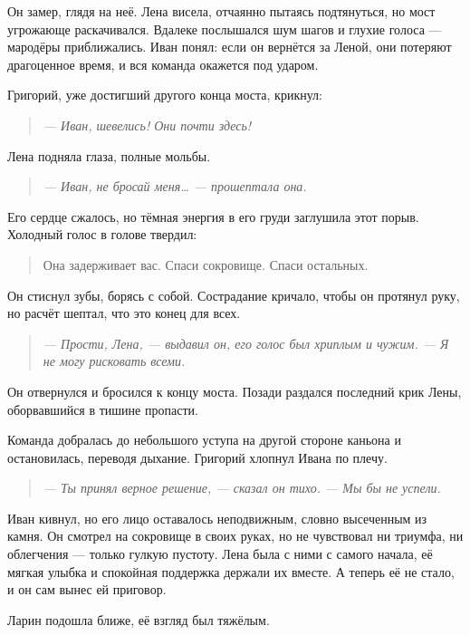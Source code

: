 \documentclass[12pt,a4paper]{book} %
\newenvironment{dialogue}{\begin{quote}\itshape}{\end{quote}}
\begin{document}
Он замер, глядя на неё. Лена висела, отчаянно пытаясь подтянуться, но мост угрожающе раскачивался. Вдалеке послышался шум шагов и глухие голоса --- мародёры приближались. Иван понял: если он вернётся за Леной, они потеряют драгоценное время, и вся команда окажется под ударом.

Григорий, уже достигший другого конца моста, крикнул:

\begin{dialogue}
--- Иван, шевелись! Они почти здесь!
\end{dialogue}

Лена подняла глаза, полные мольбы.

\begin{dialogue}
--- Иван, не бросай меня… --- прошептала она.
\end{dialogue}

Его сердце сжалось, но тёмная энергия в его груди заглушила этот порыв. Холодный голос в голове твердил:

\begin{quote}
Она задерживает вас. Спаси сокровище. Спаси остальных.
\end{quote}

Он стиснул зубы, борясь с собой. Сострадание кричало, чтобы он протянул руку, но расчёт шептал, что это конец для всех.

\begin{dialogue}
--- Прости, Лена, --- выдавил он, его голос был хриплым и чужим. --- Я не могу рисковать всеми.
\end{dialogue}

Он отвернулся и бросился к концу моста. Позади раздался последний крик Лены, оборвавшийся в тишине пропасти.

Команда добралась до небольшого уступа на другой стороне каньона и остановилась, переводя дыхание. Григорий хлопнул Ивана по плечу.

\begin{dialogue}
--- Ты принял верное решение, --- сказал он тихо. --- Мы бы не успели.
\end{dialogue}

Иван кивнул, но его лицо оставалось неподвижным, словно высеченным из камня. Он смотрел на сокровище в своих руках, но не чувствовал ни триумфа, ни облегчения --- только гулкую пустоту. Лена была с ними с самого начала, её мягкая улыбка и спокойная поддержка держали их вместе. А теперь её не стало, и он сам вынес ей приговор.

Ларин подошла ближе, её взгляд был тяжёлым.
\end{document}

